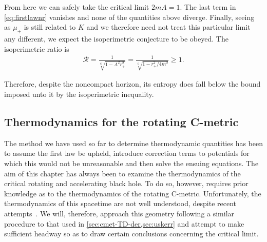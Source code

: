 \documentclass[
twoside,
openright,
frontopenright,
]{dmathesis}
\begin{document}
From here we can safely take the critical limit $2mA = 1$. The last term in
\cref{eq:firstlawnr} vanishes and none of the quantities above diverge. Finally,
seeing as $\mu_+$ is still related to $K$ and we therefore need not treat this
particular limit any different, we expect the isoperimetric
conjecture to be obeyed. The isoperimetric ratio is
\begin{align}
  \mathcal{R} =\frac{1}{\sqrt[6~]{1-A^2r_+^2}} =
  \frac{1}{\sqrt[6~]{1-r_+^2/4m^2}}\geqslant 1. 
\end{align}

Therefore, despite the noncompact horizon, its entropy does fall below the
bound imposed unto it by the isoperimetric inequality. 

\subsection{Thermodynamics for the rotating C-metric}

The method we have used so far to determine thermodynamic quantities has been to
assume the first law be upheld, introduce correction terms to potentials for
which this would not be unreasonable and then solve the ensuing equations. The
aim of this chapter has always been to examine the thermodynamics of the
critical rotating and accelerating black hole. To do so, however, requires prior
knowledge as to the thermodynamics of the rotating C-metric. Unfortunately, the
thermodynamics of this spacetime are not well understood, despite recent
attempts~\cite{Astorino:2016ybm}. We will, therefore, approach this geometry
following a similar procedure to that used in \cref{sec:cmet-TD-der,sec:uskerr}
and attempt to make sufficient headway so as to draw certain conclusions
concerning the critical limit.
\end{document}
